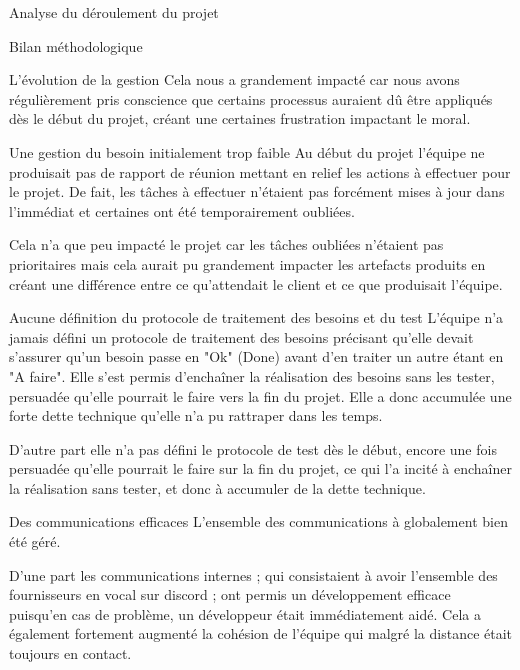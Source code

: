 \documentclass[]{article}
\begin{document}
{\begin{section}{Analyse du déroulement du projet}
\begin{subsection}{Bilan méthodologique}
\begin{subsubsection}{L'évolution de la gestion}
         Cela nous a grandement impacté car nous avons régulièrement pris conscience que certains processus auraient dû être appliqués dès le début du projet, créant une certaines frustration impactant le moral.
     \end{subsubsection}

     \begin{subsubsection}{Une gestion du besoin initialement trop faible}
         Au début du projet l'équipe ne produisait pas de rapport de réunion mettant en relief les actions à effectuer pour le projet. De fait, les tâches à effectuer n'étaient pas forcément mises à jour dans l'immédiat et certaines ont été temporairement oubliées.

         Cela n'a que peu impacté le projet car les tâches oubliées n'étaient pas prioritaires mais cela aurait pu grandement impacter les artefacts produits en créant une différence entre ce qu'attendait le client et ce que produisait l'équipe.
     \end{subsubsection}

     \begin{subsubsection}{Aucune définition du protocole de traitement des besoins et du test}
         L'équipe n'a jamais défini un protocole de traitement des besoins précisant qu'elle devait s'assurer qu'un besoin passe en "Ok" (Done) avant d'en traiter un autre étant en "A faire". Elle s'est permis d'enchaîner la réalisation des besoins sans les tester, persuadée qu'elle pourrait le faire vers la fin du projet. Elle a donc accumulée une forte dette technique qu'elle n'a pu rattraper dans les temps.

         D'autre part elle n'a pas défini le protocole de test dès le début, encore une fois persuadée qu'elle pourrait le faire sur la fin du projet, ce qui l'a incité à enchaîner la réalisation sans tester, et donc à accumuler de la dette technique.
     \end{subsubsection}

     \begin{subsubsection}{Des communications efficaces}
         L'ensemble des communications à globalement bien été géré.

         D'une part les communications internes ; qui consistaient à avoir l'ensemble des fournisseurs en vocal sur discord ; ont permis un développement efficace puisqu'en cas de problème, un développeur était immédiatement aidé. Cela a également fortement augmenté la cohésion de l'équipe qui malgré la distance était toujours en contact.


\end{subsubsection}
\end{subsection}
\end{section}}
\end{document}
